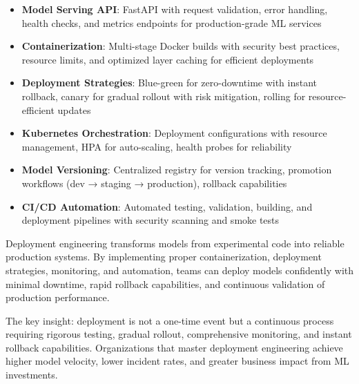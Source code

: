 \begin{itemize}
    \item \textbf{Model Serving API}: FastAPI with request validation, error handling, health checks, and metrics endpoints for production-grade ML services

    \item \textbf{Containerization}: Multi-stage Docker builds with security best practices, resource limits, and optimized layer caching for efficient deployments

    \item \textbf{Deployment Strategies}: Blue-green for zero-downtime with instant rollback, canary for gradual rollout with risk mitigation, rolling for resource-efficient updates

    \item \textbf{Kubernetes Orchestration}: Deployment configurations with resource management, HPA for auto-scaling, health probes for reliability

    \item \textbf{Model Versioning}: Centralized registry for version tracking, promotion workflows (dev → staging → production), rollback capabilities

    \item \textbf{CI/CD Automation}: Automated testing, validation, building, and deployment pipelines with security scanning and smoke tests
\end{itemize}

Deployment engineering transforms models from experimental code into reliable production systems. By implementing proper containerization, deployment strategies, monitoring, and automation, teams can deploy models confidently with minimal downtime, rapid rollback capabilities, and continuous validation of production performance.

The key insight: deployment is not a one-time event but a continuous process requiring rigorous testing, gradual rollout, comprehensive monitoring, and instant rollback capabilities. Organizations that master deployment engineering achieve higher model velocity, lower incident rates, and greater business impact from ML investments.
